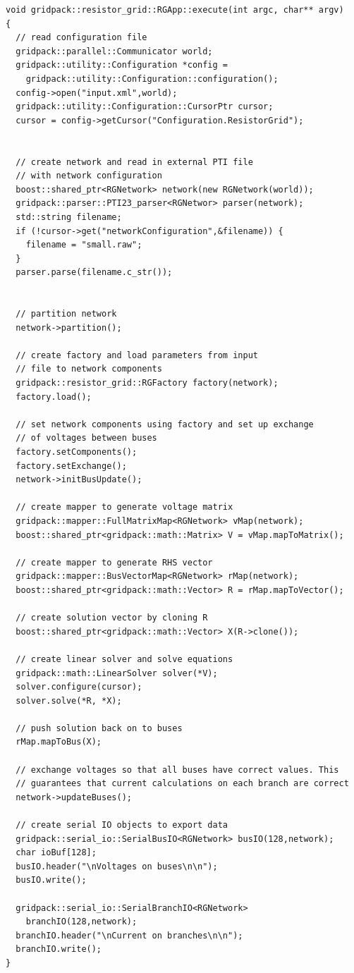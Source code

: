 {
\color{red}
\begin{Verbatim}[fontseries=b]
void gridpack::resistor_grid::RGApp::execute(int argc, char** argv)
{
  // read configuration file
  gridpack::parallel::Communicator world;
  gridpack::utility::Configuration *config =
    gridpack::utility::Configuration::configuration();
  config->open("input.xml",world);
  gridpack::utility::Configuration::CursorPtr cursor;
  cursor = config->getCursor("Configuration.ResistorGrid");


  // create network and read in external PTI file
  // with network configuration
  boost::shared_ptr<RGNetwork> network(new RGNetwork(world));
  gridpack::parser::PTI23_parser<RGNetwor> parser(network);
  std::string filename;
  if (!cursor->get("networkConfiguration",&filename)) {
    filename = "small.raw";
  }
  parser.parse(filename.c_str());


  // partition network
  network->partition();

  // create factory and load parameters from input
  // file to network components
  gridpack::resistor_grid::RGFactory factory(network);
  factory.load();

  // set network components using factory and set up exchange
  // of voltages between buses
  factory.setComponents();
  factory.setExchange();
  network->initBusUpdate();

  // create mapper to generate voltage matrix
  gridpack::mapper::FullMatrixMap<RGNetwork> vMap(network);
  boost::shared_ptr<gridpack::math::Matrix> V = vMap.mapToMatrix();

  // create mapper to generate RHS vector
  gridpack::mapper::BusVectorMap<RGNetwork> rMap(network);
  boost::shared_ptr<gridpack::math::Vector> R = rMap.mapToVector();

  // create solution vector by cloning R
  boost::shared_ptr<gridpack::math::Vector> X(R->clone());

  // create linear solver and solve equations
  gridpack::math::LinearSolver solver(*V);
  solver.configure(cursor);
  solver.solve(*R, *X);

  // push solution back on to buses
  rMap.mapToBus(X);

  // exchange voltages so that all buses have correct values. This
  // guarantees that current calculations on each branch are correct
  network->updateBuses();

  // create serial IO objects to export data
  gridpack::serial_io::SerialBusIO<RGNetwork> busIO(128,network);
  char ioBuf[128];
  busIO.header("\nVoltages on buses\n\n");
  busIO.write();

  gridpack::serial_io::SerialBranchIO<RGNetwork>
    branchIO(128,network);
  branchIO.header("\nCurrent on branches\n\n");
  branchIO.write();
}
\end{Verbatim}
}

